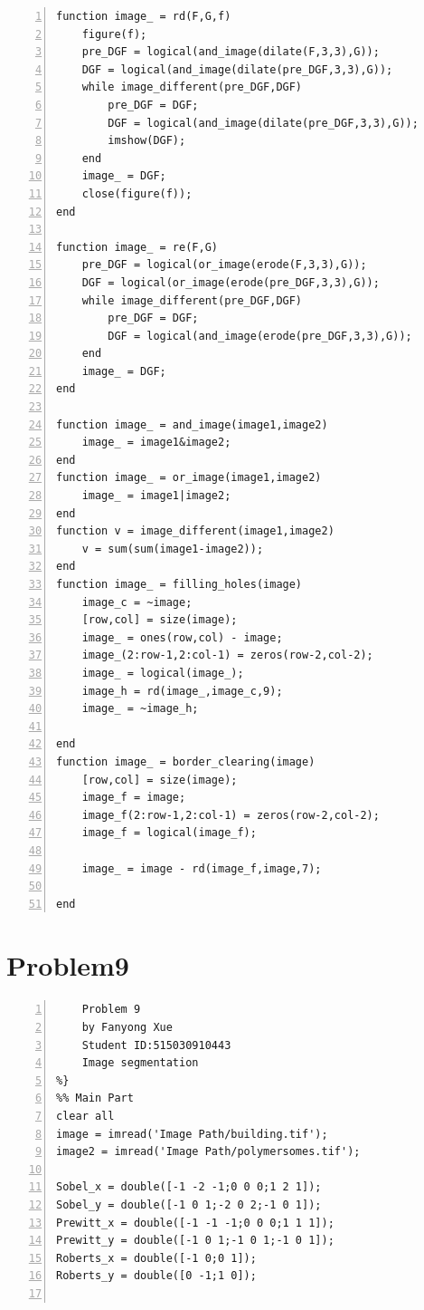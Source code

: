 \documentclass[11pt,oneside]{book}
\begin{document}
\begin{appendices}
\begin{lstlisting}[numbers=left, numberstyle=\tiny,keywordstyle=\color{blue!70},commentstyle=\color{red!50!green!50!blue!50},frame=shadowbox, rulesepcolor=\color{red!20!green!20!blue!20}]
function image_ = rd(F,G,f)
    figure(f);
    pre_DGF = logical(and_image(dilate(F,3,3),G));
    DGF = logical(and_image(dilate(pre_DGF,3,3),G));
    while image_different(pre_DGF,DGF)
        pre_DGF = DGF;
        DGF = logical(and_image(dilate(pre_DGF,3,3),G));
        imshow(DGF);
    end
    image_ = DGF;
    close(figure(f));
end

function image_ = re(F,G)
    pre_DGF = logical(or_image(erode(F,3,3),G));
    DGF = logical(or_image(erode(pre_DGF,3,3),G));
    while image_different(pre_DGF,DGF)
        pre_DGF = DGF;
        DGF = logical(and_image(erode(pre_DGF,3,3),G));
    end
    image_ = DGF;
end

function image_ = and_image(image1,image2)
    image_ = image1&image2;
end
function image_ = or_image(image1,image2)
    image_ = image1|image2;
end
function v = image_different(image1,image2)
    v = sum(sum(image1-image2));
end
function image_ = filling_holes(image)
    image_c = ~image;
    [row,col] = size(image);
    image_ = ones(row,col) - image;
    image_(2:row-1,2:col-1) = zeros(row-2,col-2);
    image_ = logical(image_);
    image_h = rd(image_,image_c,9);
    image_ = ~image_h;
    
end
function image_ = border_clearing(image)
    [row,col] = size(image);
    image_f = image;
    image_f(2:row-1,2:col-1) = zeros(row-2,col-2);
    image_f = logical(image_f);
    
    image_ = image - rd(image_f,image,7);
    
end
\end{lstlisting}

\section{Problem9}

\begin{lstlisting}[numbers=left, numberstyle=\tiny,keywordstyle=\color{blue!70},commentstyle=\color{red!50!green!50!blue!50},frame=shadowbox, rulesepcolor=\color{red!20!green!20!blue!20}] 
%{
    Problem 9
    by Fanyong Xue
    Student ID:515030910443
    Image segmentation
%}
%% Main Part
clear all
image = imread('Image Path/building.tif');
image2 = imread('Image Path/polymersomes.tif');

Sobel_x = double([-1 -2 -1;0 0 0;1 2 1]);
Sobel_y = double([-1 0 1;-2 0 2;-1 0 1]);
Prewitt_x = double([-1 -1 -1;0 0 0;1 1 1]);
Prewitt_y = double([-1 0 1;-1 0 1;-1 0 1]);
Roberts_x = double([-1 0;0 1]);
Roberts_y = double([0 -1;1 0]);


\end{lstlisting}
\end{appendices}
\end{document}
